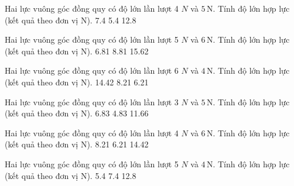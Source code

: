 \begin{ex}
Hai lực vuông góc đồng quy có độ lớn lần lượt 4 $N$ và $5\,\text{N}$. Tính độ lớn hợp lực (kết quả theo đơn vị N).
\choice
{7.4}
{}
{5.4}
{12.8}
\end{ex}

\begin{ex}
Hai lực vuông góc đồng quy có độ lớn lần lượt 5 $N$ và $6\,\text{N}$. Tính độ lớn hợp lực (kết quả theo đơn vị N).
\choice
{6.81}
{8.81}
{}
{15.62}
\end{ex}

\begin{ex}
Hai lực vuông góc đồng quy có độ lớn lần lượt 6 $N$ và $4\,\text{N}$. Tính độ lớn hợp lực (kết quả theo đơn vị N).
\choice
{14.42}
{8.21}
{6.21}
{}
\end{ex}

\begin{ex}
Hai lực vuông góc đồng quy có độ lớn lần lượt 3 $N$ và $5\,\text{N}$. Tính độ lớn hợp lực (kết quả theo đơn vị N).
\choice
{}
{6.83}
{4.83}
{11.66}
\end{ex}

\begin{ex}
Hai lực vuông góc đồng quy có độ lớn lần lượt 4 $N$ và $6\,\text{N}$. Tính độ lớn hợp lực (kết quả theo đơn vị N).
\choice
{8.21}
{}
{6.21}
{14.42}
\end{ex}

\begin{ex}
Hai lực vuông góc đồng quy có độ lớn lần lượt 5 $N$ và $4\,\text{N}$. Tính độ lớn hợp lực (kết quả theo đơn vị N).
\choice
{5.4}
{7.4}
{}
{12.8}
\end{ex}

